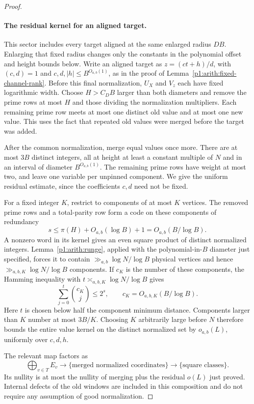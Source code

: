 \begin{proof}
\paragraph{The residual kernel for an aligned target.}
This sector includes every target aligned at the same enlarged radius
$DB$.  Enlarging that fixed radius changes only the constants in the
polynomial offset and height bounds below.
Write an aligned target as
$z=(ct+h)/d$, with $(c,d)=1$ and
$c,d,|h|\leq B^{O_{a,b}(1)}$, as in the proof of
Lemma~\ref{p1:arith:fixed-channel-rank}.
Before this final normalization, $U_X$ and $V_z$ each have fixed
logarithmic width.  Choose $H>C_D B$ larger than both diameters and
remove the prime rows at most $H$ and those dividing the normalization
multipliers.  Each remaining prime row meets at most one distinct old
value and at most one new value.  This uses the fact that repeated
old values were merged before the target was added.

After the common normalization, merge equal values once more.
There are at most $3B$ distinct integers, all at height at least a
constant multiple of $N$ and in an interval of diameter
$B^{O_{a,b}(1)}$.  The remaining prime rows have weight at most two,
and leave one variable per unpinned component.  We give the uniform
residual estimate, since the coefficients $c,d$ need not be fixed.

For a fixed integer $K$, restrict to components of at most $K$ vertices.
The removed prime rows and a total-parity row form a code on these
components of redundancy
\[
 s\leq\pi(H)+O_{a,b}(\log B)+1=O_{a,b}(B/\log B).
\]
A nonzero word in its kernel gives an even square product of distinct
normalized integers.  Lemma~\ref{p1:arith:runge}, applied with the
polynomial-in-$B$ diameter just specified, forces it to contain
$\gg_{a,b}\log N/\log B$ physical vertices and hence
$\gg_{a,b,K}\log N/\log B$ components.
If $c_K$ is the number of these components, the Hamming inequality with
$t\asymp_{a,b,K}\log N/\log B$ gives
\[
 \sum_{j=0}^{t}\binom{c_K}{j}\leq2^s,
 \qquad c_K=O_{a,b,K}(B/\log B).
\]
Here $t$ is chosen below half the component minimum distance.
Components larger than $K$ number at most $3B/K$.
Choosing $K$ arbitrarily large before $N$ therefore bounds the entire
value kernel on the distinct normalized set by $o_{a,b}(L)$,
uniformly over $c,d,h$.

The relevant map factors as
\[
 \bigoplus_{v\in T}E_v
   \longrightarrow\{\text{merged normalized coordinates}\}
   \longrightarrow\{\text{square classes}\}.
\]
Its nullity is at most the nullity of merging plus the residual $o(L)$
just proved.  Internal defects of the old windows are included in this
composition and do not require any assumption of good normalization.


\end{proof}
